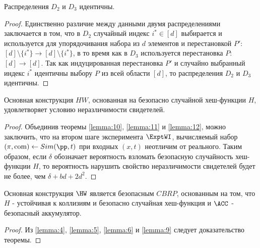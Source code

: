 \begin{theorem}
	\label{lemma:12}
	Распределения $D_2$ и $D_3$ идентичны.
\end{theorem}

\begin{proof}
	Единственно различие между данными двумя распределениями заключается в том, что в $D_2$ случайный индекс $i^* \in [d]$ выбирается и используется для упорядочивания набора из $d$ элементов и перестановкой $P'$: $[d] \setminus \{i^*\} \rightarrow [d] \setminus \{i^*\}$, в то время как в $D_3$ используется перестановка $P$: $[d] \rightarrow [d]$.
	Так как индуцированная перестановка $P'$ и случайно выбранный индекс $i^*$ идентичны выбору $P$ из всей области $[d]$, то распределения $D_2$ и $D_3$ идентичны.
\end{proof}

\begin{theorem}
	\label{lemma:9}
	Основная конструкция $HW$, основанная на безопасно случайной хеш-функции $H$, удовлетворяет условию неразличимости свидетелей.
\end{theorem}

\begin{proof}
	Объединив теоремы \ref{lemma:10}, \ref{lemma:11} и \ref{lemma:12}, можно заключить, что на втором шаге эксперимента $\ExptWI$, вычисляемый набор $(\pi, \com) \leftarrow Sim(\pp, t)$ при входных $(x, t)$ неотличим от реального.
	Таким образом, если $\delta$ обозначает вероятность взломать безопасную случайность хеш-функции $H$, то вероятность нарушить свойство неразличимости свидетелей будет не более, чем $\delta + bd + 2d^2$.
\end{proof}

\begin{theorem}
	\label{theorem:2}
	Основная конструкция $\HW$ является безопасным $CBRP$, основанным на том, что $H$ - устойчивая к коллизиям и безопасно случайная хеш-функция и $\ACC$ - безопасный аккумулятор.
\end{theorem}

\begin{proof}
	Из \ref{lemma:4}, \ref{lemma:5}, \ref{lemma:6} и \ref{lemma:9} следует доказательство теоремы.
\end{proof}
